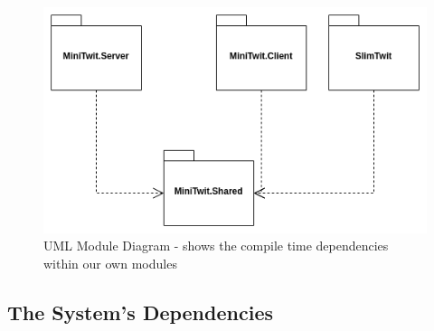 \begin{figure}
    \centering
    \includegraphics[scale=0.5]{images/ModuleDiagram.png}
    \caption{UML Module Diagram - shows the compile time dependencies within our own modules}
    \label{fig:module-digram}
\end{figure}


\subsection{The System's Dependencies}
